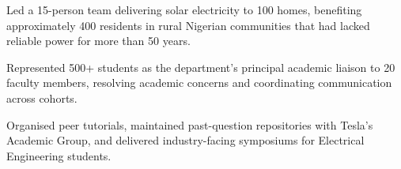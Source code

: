 
\begin{details}
    \item Led a 15-person team delivering solar electricity to 100 homes, benefiting approximately 400 residents in rural Nigerian communities that had lacked reliable power for more than 50 years.
\end{details}

\begin{details}
    \item Represented 500+ students as the department's principal academic liaison to 20 faculty members, resolving academic concerns and coordinating communication across cohorts.
    \item Organised peer tutorials, maintained past-question repositories with Tesla's Academic Group, and delivered industry-facing symposiums for Electrical Engineering students.
\end{details}
